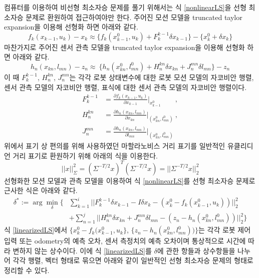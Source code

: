 \documentclass[master,korean,final]{cbnu-ecs}
\begin{document}
컴퓨터를 이용하여 비선형 최소자승 문제를 풀기 위해서는 식 \eqref{nonlinearLS}을 선형 최소자승 문제로 환원하여 접근하여야만 한다. 
주어진 모션 모델을 truncated taylor expansion을 이용해 선형화 하면 아래와 같다.
\begin{equation}
\label{motion_model_linear}
f_k(x_{k-1}, u_k)-x_k\approx \{ f_k(x^0_{k-1}, u_k) +F_k^{k-1}\delta x_{k-1} \}-\{ x_k^0 + \delta x_k \}
\end{equation}
마찬가지로 주어진 센서 관측 모델을 truncated taylor expansion을 이용해 선형화 하면 아래와 같다.
\begin{equation}
\label{measurement_model_linear}
h_n(x_{kn}, l_{mn})-z_n\approx \ \{ h_n(x^0_{kn}, l^0_{mn}) + H^{kn}_n \delta x_{kn} + J_n^{mn}\delta l_{mn} \}-z_n
\end{equation}
이 때 $F_k^{k-1}$, $H_n^{kn}$, $J_n^{mn}$는 각각 로봇 상태변수에 대한 로봇 모션 모델의 자코비안 행렬, 센서 관측 모델의 자코비안 행렬, 표식에 대한 센서 관측 모델의 자코비안 행렬이다.
\begin{equation}
\label{model_jacobian}
\begin{split}
F_k^{k-1}&=\frac{\partial f_k(x_{k-1}, u_k)}{\partial x_{k-1}} \bigg|_{x^0_{k-1}}\qquad,\\
H_n^{kn}&=\frac{\partial h_n(x_{kn}, l_{mn})}{\partial x_{kn}} \bigg|_{(x^0_{kn},l^0_{mn})}\ ,\\
J_n^{mn}&=\frac{\partial h_n(x_{kn}, l_{mn})}{\partial l_{mn}} \bigg|_{(x^0_{kn},l^0_{mn})}
\end{split}
\end{equation}
위에서 표기 상 편의를 위해 사용하였던 마할라노비스 거리 표기를 일반적인 유클리디언 거리 표기로 환원하기 위해 아래의 식을 이용한다.
\begin{equation}
\label{mahalanobis_to_euclidean}
|| x ||^2_\Sigma = (\Sigma^{-T/2}x)^T(\Sigma^{-T/2}x) = || \Sigma^{-T/2}x ||^2_2
\end{equation}
선형화한 모션 모델과 관측 모델을 이용하여 식 \eqref{nonlinearLS}를 선형 최소자승 문제로 근사한 식은 아래와 같다.
\begin{equation}
\label{linearizedLS}
\begin{split}
\delta^*:=\arg\min_\delta \bigg\{& \sum_{k=1}^i || F_k^{k-1}\delta x_{k-1} - I\delta x_k - (x_k^0 - f_k(x^0_{k-1}, u_k) )  ||^2_2 \\
&+ \sum_{n=1}^j || H^{kn}_n \delta x_{kn} + J_n^{mn}\delta l_{mn} - (z_n - h_n(x^0_{kn}, l^0_{mn})) ||^2_2\bigg\}
\end{split}
\end{equation}
식 \eqref{linearizedLS}에서 $\{x_k^0 - f_k(x^0_{k-1}, u_k\}$, $\{z_n - h_n(x^0_{kn}, l^0_{mn})) \}$는 각각 로봇 제어 입력 또는 odometry의 예측 오차, 센서 측정치의 예측 오차이며 통상적으로 시간에 따라 변하지 않는 상수이다. 이에 식 \eqref{linearizedLS}를 $\delta$에 관한 항들과 상수항들을 나누어 각각 행렬, 벡터 형태로 묶으면 아래와 같이 일반적인 선형 최소자승 문제의 형태로 정리할 수 있다.
\end{document}
